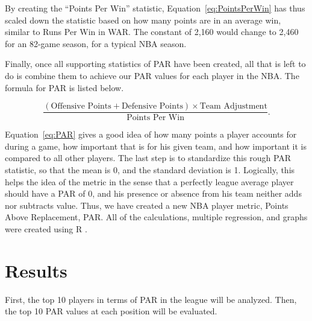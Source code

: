 \documentclass[titlepage, 12pt]{article}
\begin{document}
By creating the ``Points Per Win'' statistic, Equation~\eqref{eq:PointsPerWin} 
has thus scaled down the statistic based 
on how many points are in an average win, similar to Runs Per Win in 
WAR. The constant of 2,160 would change to 2,460 for an 82-game 
season, for a typical NBA season.

Finally, once all supporting statistics of PAR have been created, all that is left to 
do is combine them to achieve our PAR values for each player in the 
NBA. The formula for PAR is listed below.

\begin{equation}
 \label{eq:PAR}
  \frac{(\text{Offensive Points} + \text{Defensive Points}) \times \text{Team Adjustment}}
  {\text{Points Per Win}}.
\end{equation}

Equation~\eqref{eq:PAR} gives a good idea of how many points a player 
accounts for 
during a 
game, how important that is for 
his given team, and how important it is compared to all other players. The 
last step is to standardize this 
 rough PAR statistic, so that the mean is 0, and the standard deviation is 
1. 
Logically, this helps the idea of the 
metric in the sense that a perfectly league average player should have a 
PAR of 0, and his presence or 
absence from his team neither adds nor subtracts value. Thus, we have 
created a new NBA player metric, 
Points Above Replacement, PAR. All of the calculations, multiple 
regression, and graphs were created using R \citep{R}.
 
 
\section{Results}
First, the top 10 players in terms of PAR in the league will be analyzed. Then, the top 10 PAR values at each position will be evaluated.
\end{document}
